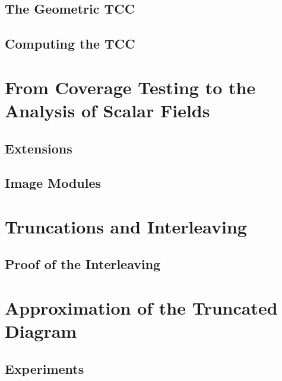 \documentclass[12pt]{article}
\begin{document}
\subsection{The Geometric TCC}\label{sec:geo_tcc}


\subsection{Computing the TCC}
  


\clearpage
\section{From Coverage Testing to the Analysis of Scalar Fields}\label{sec:middle}
%


\subsection{Extensions}
  

\subsection{Image Modules}


\clearpage
\section{Truncations and Interleaving}\label{sec:interleaving}




\subsection{Proof of the Interleaving}
  


\clearpage
\section{Approximation of the Truncated Diagram}\label{sec:truncations}
  

  \subsection{Experiments}
    
\end{document}
